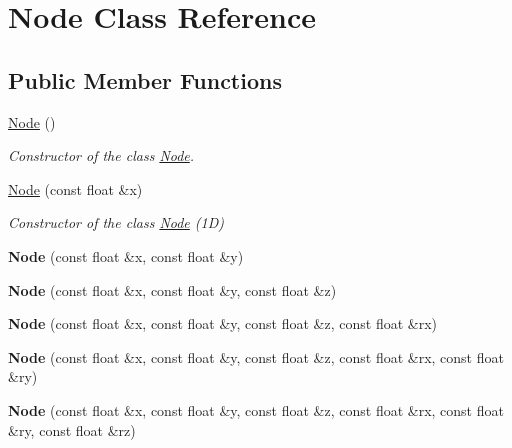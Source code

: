 \hypertarget{class_node}{\section{Node Class Reference}
\label{class_node}
}
\subsection*{Public Member Functions}
\begin{DoxyCompactItemize}
\item 
\hyperlink{class_node_ad7a34779cad45d997bfd6d3d8043c75f}{Node} ()
\begin{DoxyCompactList}\small\item\em Constructor of the class \hyperlink{class_node}{Node}. \end{DoxyCompactList}\item 
\hyperlink{class_node_ab4f09787f68f60e3113b13765dcea5b6}{Node} (const float \&x)
\begin{DoxyCompactList}\small\item\em Constructor of the class \hyperlink{class_node}{Node} (1\-D) \end{DoxyCompactList}\item 
\hypertarget{class_node_a620187a44025c75eeb9078be94e6ddfc}{{\bfseries Node} (const float \&x, const float \&y)}\label{class_node_a620187a44025c75eeb9078be94e6ddfc}

\item 
\hypertarget{class_node_a964376712af9d7a785debc0bc204cc01}{{\bfseries Node} (const float \&x, const float \&y, const float \&z)}\label{class_node_a964376712af9d7a785debc0bc204cc01}

\item 
\hypertarget{class_node_a3b50c25e03ec70f076da3ed11caec7f2}{{\bfseries Node} (const float \&x, const float \&y, const float \&z, const float \&rx)}\label{class_node_a3b50c25e03ec70f076da3ed11caec7f2}

\item 
\hypertarget{class_node_a02c999afe2369d2c1f3b5c662fbeef29}{{\bfseries Node} (const float \&x, const float \&y, const float \&z, const float \&rx, const float \&ry)}\label{class_node_a02c999afe2369d2c1f3b5c662fbeef29}

\item 
\hypertarget{class_node_af7afeb76b02d1ef9ccd8aeb4843f82c3}{{\bfseries Node} (const float \&x, const float \&y, const float \&z, const float \&rx, const float \&ry, const float \&rz)}\label{class_node_af7afeb76b02d1ef9ccd8aeb4843f82c3}


\end{DoxyCompactItemize}
